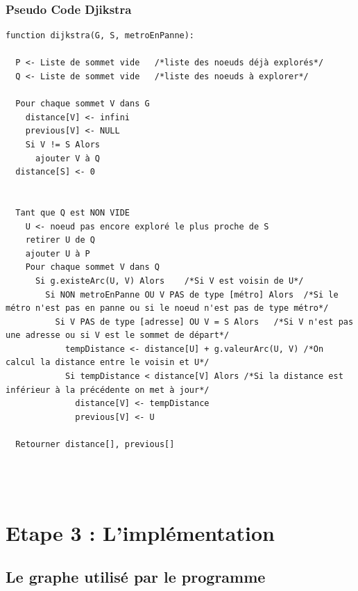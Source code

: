       \subsubsection{Pseudo Code Djikstra}
        \begin{lstlisting}
function dijkstra(G, S, metroEnPanne):

  P <- Liste de sommet vide   /*liste des noeuds déjà explorés*/
  Q <- Liste de sommet vide   /*liste des noeuds à explorer*/

  Pour chaque sommet V dans G
    distance[V] <- infini
    previous[V] <- NULL
    Si V != S Alors
      ajouter V à Q
  distance[S] <- 0


  Tant que Q est NON VIDE
    U <- noeud pas encore exploré le plus proche de S
    retirer U de Q
    ajouter U à P
    Pour chaque sommet V dans Q
      Si g.existeArc(U, V) Alors    /*Si V est voisin de U*/
        Si NON metroEnPanne OU V PAS de type [métro] Alors  /*Si le métro n'est pas en panne ou si le noeud n'est pas de type métro*/
          Si V PAS de type [adresse] OU V = S Alors   /*Si V n'est pas une adresse ou si V est le sommet de départ*/
            tempDistance <- distance[U] + g.valeurArc(U, V) /*On calcul la distance entre le voisin et U*/
            Si tempDistance < distance[V] Alors /*Si la distance est inférieur à la précédente on met à jour*/
              distance[V] <- tempDistance
              previous[V] <- U

  Retourner distance[], previous[]




        \end{lstlisting}


      \newpage


\section{Etape 3 : L'implémentation}

  \subsection{Le graphe utilisé par le programme}

